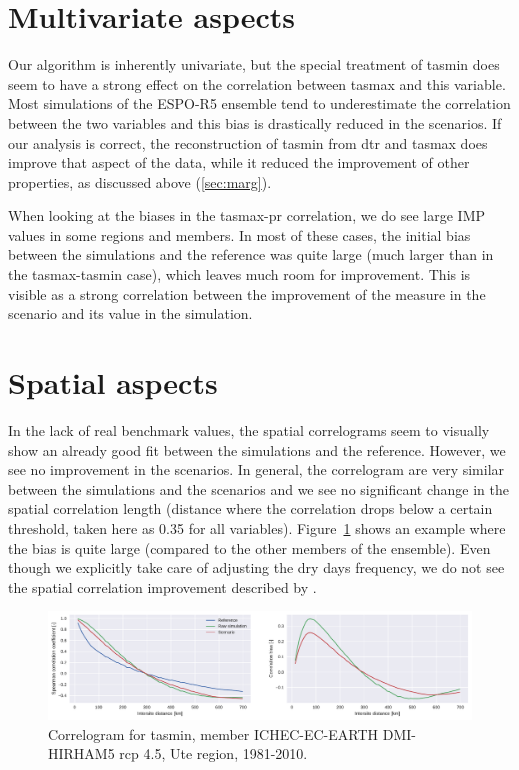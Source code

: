 \documentclass[letterpaper,10pt]{article}
\begin{document}
\section{Multivariate aspects}
Our algorithm is inherently univariate, but the special treatment of tasmin does seem to have a strong effect on the correlation between tasmax and this variable. Most simulations of the ESPO-R5 ensemble tend to underestimate the correlation between the two variables and this bias is drastically reduced in the scenarios. If our analysis is correct, the reconstruction of tasmin from dtr and tasmax does improve that aspect of the data, while it reduced the improvement of other properties, as discussed above (\ref{sec:marg}).

When looking at the biases in the tasmax-pr correlation, we do see large IMP values in some regions and members. In most of these cases, the initial bias between the simulations and the reference was quite large (much larger than in the tasmax-tasmin case), which leaves much room for improvement. This is visible as a strong correlation between the improvement of the measure in the scenario and its value in the simulation.

\section{Spatial aspects}
In the lack of real benchmark values, the spatial correlograms seem to visually show an already good fit between the simulations and the reference. However, we see no improvement in the scenarios. In general, the correlogram are very similar between the simulations and the scenarios and we see no significant change in the spatial correlation length (distance where the correlation drops below a certain threshold, taken here as 0.35 for all variables). Figure~\ref{fig:scorr} shows an example where the bias is quite large (compared to the other members of the ensemble). Even though we explicitly take care of adjusting the dry days frequency, we do not see the spatial correlation improvement described by \cite{Francois2020}.

\begin{figure}
\centering
\includegraphics[width=\textwidth]{../images/correlogram_tasmin_diags.pdf}
\caption{Correlogram for tasmin, member ICHEC-EC-EARTH DMI-HIRHAM5 rcp 4.5, Ute region, 1981-2010.}\label{fig:scorr}
\end{figure}
\end{document}
